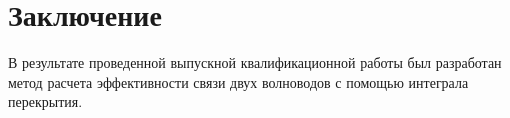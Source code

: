 \section*{Заключение}

В результате проведенной выпускной квалификационной работы был разработан метод расчета эффективности связи двух волноводов с помощью интеграла перекрытия.